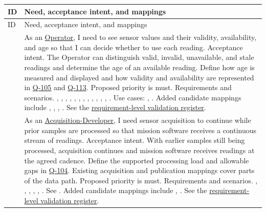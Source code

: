 \small
\begin{tabularx}{\linewidth}{L{1.8cm}Y}
\caption{User Story Register\label{Table:UserStories}}\\
\toprule
ID & Need, acceptance intent, and mappings\\\midrule
\endfirsthead
\toprule
ID & Need, acceptance intent, and mappings\\\midrule
\endhead
\bottomrule
\endlastfoot
{} & As an \hyperref[Stakeholder:Operator]{Operator}, I need to see sensor values and their validity, availability, and age so that I can decide whether to use each reading. Acceptance intent. The Operator can distinguish valid, invalid, unavailable, and stale readings and determine the age of an available reading. Define how age is measured and displayed and how validity and availability are represented in \hyperref[Question:Q-105]{Q-105} and \hyperref[Question:Q-113]{Q-113}. Proposed priority is \gls{must}. Requirements and scenarios. , , , , , , , , , , , , . Use cases: , . Added candidate mappings include , , , . See the \hyperref[Table:ValidationRegister]{requirement-level validation register}.\\
 & As an \hyperref[Stakeholder:Acquisition-Developer]{Acquisition-Developer}, I need sensor acquisition to continue while prior samples are processed so that mission software receives a continuous stream of readings. Acceptance intent. With earlier samples still being processed, acquisition continues and mission software receives readings at the agreed cadence. Define the supported processing load and allowable gaps in \hyperref[Question:Q-104]{Q-104}. Existing acquisition and publication mappings cover parts of the data path. Proposed priority is \gls{must}. Requirements and scenarios. , , , , , . See . Added candidate mappings include , . See the \hyperref[Table:ValidationRegister]{requirement-level validation register}.\\

\end{tabularx}

